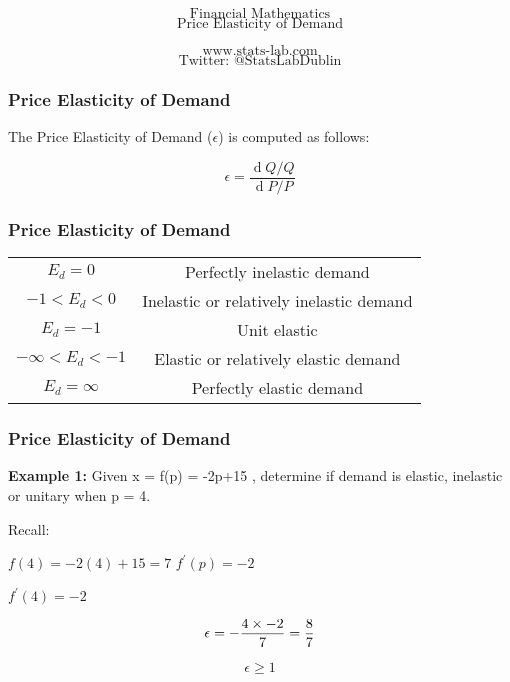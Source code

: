 \documentclass{beamer}
\begin{document}
\begin{frame}
\Huge
\[\mbox{Financial Mathematics}\]
\LARGE
\[\mbox{Price Elasticity of Demand}\]

\Large
\[\mbox{www.stats-lab.com}\]
\[\mbox{Twitter: @StatsLabDublin}\]
\end{frame}

\begin{frame}
\frametitle{Price Elasticity of Demand}
\Large
The Price Elasticity of Demand ($\epsilon$) is computed as follows:

\[ \epsilon = \frac{\operatorname d Q/Q}{\operatorname d P/P} \]
\end{frame}

\begin{frame}
\frametitle{Price Elasticity of Demand}
\Large

\begin{tabular}{|c|c|}
$E_d = 0$ & Perfectly inelastic demand \\
$- 1 < E_d < 0 $ &Inelastic or relatively inelastic demand\\
$E_d=  - 1 $& Unit elastic\\
$ - \infty < E_d < - 1$ & 
Elastic or relatively elastic demand \\
$E_d = \infty $&
Perfectly elastic demand \\
\end{tabular} 
\end{frame}
\begin{frame}
\frametitle{Price Elasticity of Demand}
\Large


\textbf{Example 1:} Given x  = f(p) = -2p+15 , determine if demand is elastic, inelastic or unitary 
when p = 4.

Recall: 

$f(4) = -2(4) + 15 = 7$
$f^{\prime}(p) = -2$

$f^{\prime}(4) = -2$



\[ \epsilon = -\frac{4 \times -2}{7} = {8 \over 7} \]


\[ \epsilon \geq 1 \]
\end{frame}
\end{document}
